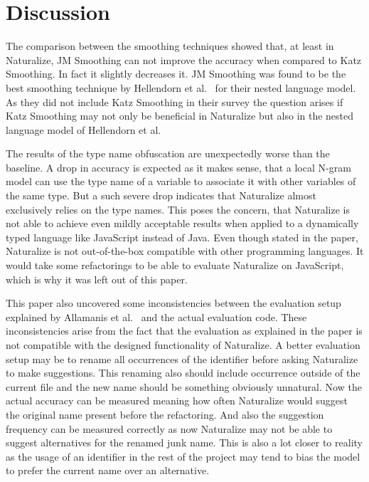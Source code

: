 \documentclass[sigconf]{acmart}
\begin{document}
\section{Discussion}
The comparison between the smoothing techniques showed that, at least in Naturalize, JM Smoothing can not improve the accuracy when compared to Katz Smoothing. In fact it slightly decreases it. JM Smoothing was found to be the best smoothing technique by Hellendorn et al.~\cite{nestedngram} for their nested language model. As they did not include Katz Smoothing in their survey the question arises if Katz Smoothing may not only be beneficial in Naturalize but also in the nested language model of Hellendorn et al.

The results of the type name obfuscation are unexpectedly worse than the baseline. A drop in accuracy is expected as it makes sense, that a local N-gram model can use the type name of a variable to associate it with other variables of the same type. But a such severe drop indicates that Naturalize almost exclusively relies on the type names. This poses the concern, that Naturalize is not able to achieve even mildly acceptable results when applied to a dynamically typed language like JavaScript instead of Java. Even though stated in the paper, Naturalize is not out-of-the-box compatible with other programming languages. It would take some refactorings to be able to evaluate Naturalize on JavaScript, which is why it was left out of this paper.

This paper also uncovered some inconsistencies between the evaluation setup explained by Allamanis et al.~\cite{naturalize} and the actual evaluation code. These inconsistencies arise from the fact that the evaluation as explained in the paper is not compatible with the designed functionality of Naturalize. A better evaluation setup may be to rename all occurrences of the identifier before asking Naturalize to make suggestions. This renaming also should include occurrence outside of the current file and the new name should be something obviously unnatural. Now the actual accuracy can be measured meaning how often Naturalize would suggest the original name present before the refactoring. And also the suggestion frequency can be measured correctly as now Naturalize may not be able to suggest alternatives for the renamed junk name. This is also a lot closer to reality as the usage of an identifier in the rest of the project may tend to bias the model to prefer the current name over an alternative.
\end{document}
